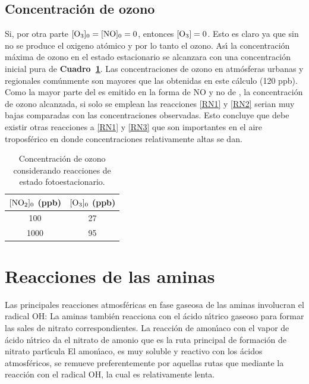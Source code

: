 \subsection{Concentraci\'on de ozono}\label{cozono}
Si, por otra parte $[\ce{O3}]_0=[\ce{NO}]_0=0$, entonces $[\ce{O3}]=0$. Esto es claro ya que sin  no se produce el oxigeno at\'omico y por lo tanto el ozono.  As\'{\i} la concentraci\'on m\'axima de ozono en el estado estacionario se alcanzara con una concentraci\'on inicial pura de  \textbf{Cuadro~\ref{ozono_foto}}. Las concentraciones de ozono en atm\'osferas urbanas y regionales com\'unmente son mayores que las obtenidas en este c\'alculo (120 ppb). Como la mayor parte del   es emitido en la forma de NO y no de  , la concentraci\'on de ozono alcanzada, si solo se emplean las reacciones \ref{RN1} y \ref{RN2} serian muy bajas comparadas con  las concentraciones observadas. Esto concluye que debe existir otras reacciones a \ref{RN1} y \ref{RN3} que son importantes en el aire troposf\'erico en donde concentraciones relativamente altas se dan.
\begin{table}[htp]
\caption[Concentraci\'on de ozono sin COV]{Concentraci\'on de ozono considerando reacciones de estado fotoestacionario.}
\begin{center}
\begin{tabular}{|c|c|}\hline
$[\ce{NO2}]_0$ (ppb) &$[\ce{O3}]_0$ (ppb) \\\hline
100   & 27\\
1000 & 95 \\ \hline
\end{tabular}
\end{center}
\label{ozono_foto}
\end{table}%

\section{Reacciones de las aminas}\label{raminas}
Las principales reacciones atmosf\'ericas en fase gaseosa de las aminas involucran el radical OH:
La aminas tambi\'en reacciona con el \'acido n\'{\i}trico gaseoso para formar las sales de nitrato correspondientes.
La reacci\'on de amon\'{\i}aco con el vapor de \'acido n\'{\i}trico da el nitrato de amonio que es la ruta principal de formaci\'on de nitrato part\'{\i}cula
El amon\'{\i}aco, es muy soluble y reactivo con los \'acidos atmosf\'ericos, se remueve preferentemente por aquellas rutas que mediante la reacci\'on con el radical OH, la cual es relativamente lenta.

